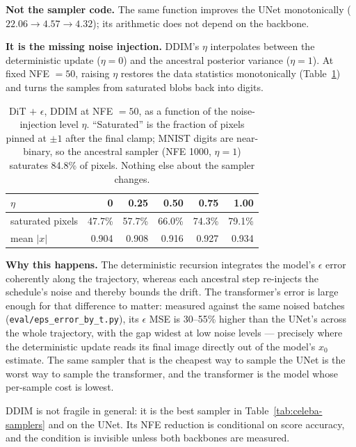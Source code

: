 \documentclass{article}
\begin{document}
\textbf{Not the sampler code.} The same function improves the UNet monotonically
($22.06 \rightarrow 4.57 \rightarrow 4.32$); its arithmetic does not depend on the backbone.

\textbf{It is the missing noise injection.} DDIM's $\eta$ interpolates between the
deterministic update ($\eta = 0$) and the ancestral posterior variance ($\eta = 1$). At fixed
NFE $=50$, raising $\eta$ restores the data statistics monotonically
(Table~\ref{tab:eta}) and turns the samples from saturated blobs back into digits.

\begin{table}[t]
  \caption{DiT $+$ $\epsilon$, DDIM at NFE $=50$, as a function of the noise-injection level
  $\eta$. ``Saturated'' is the fraction of pixels pinned at $\pm1$ after the final clamp;
  MNIST digits are near-binary, so the ancestral sampler (NFE 1000, $\eta=1$) saturates 84.8\%
  of pixels. Nothing else about the sampler changes.}
  \label{tab:eta}
  \centering
  \small
  \begin{tabular}{@{}lrrrrr@{}}
    \toprule
    $\eta$ & 0 & 0.25 & 0.50 & 0.75 & 1.00 \\
    \midrule
    saturated pixels & 47.7\% & 57.7\% & 66.0\% & 74.3\% & 79.1\% \\
    mean $|x|$       & 0.904  & 0.908 & 0.916 & 0.927 & 0.934 \\
    \bottomrule
  \end{tabular}
\end{table}

\textbf{Why this happens.} The deterministic recursion integrates the model's
$\epsilon$ error coherently along the trajectory, whereas each ancestral step re-injects the
schedule's noise and thereby bounds the drift. The transformer's error is large enough for
that difference to matter: measured against the same noised batches
(\texttt{eval/eps\_error\_by\_t.py}), its $\epsilon$ MSE is 30--55\% higher than the UNet's
across the whole trajectory, with the gap widest at low noise levels --- precisely where the
deterministic update reads its final image directly out of the model's $x_0$ estimate. The
same sampler that is the cheapest way to sample the UNet is the worst way to sample the
transformer, and the transformer is the model whose per-sample cost is lowest.

DDIM is not fragile in general: it is the best sampler in Table~\ref{tab:celeba-samplers} and
on the UNet. Its NFE reduction is conditional on score accuracy, and the condition is invisible
unless both backbones are measured.
\end{document}
